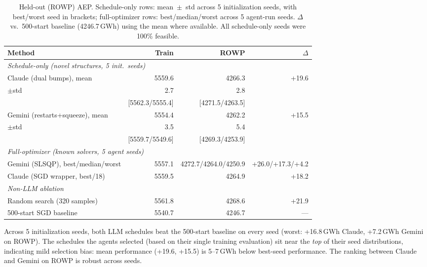 \documentclass{article}
\begin{document}
\begin{table}[t]
\caption{Held-out (ROWP) AEP. Schedule-only rows: mean~$\pm$~std
across 5 initialization seeds, with best/worst seed in brackets;
full-optimizer rows: best/median/worst across 5 agent-run seeds.
$\Delta$ vs.\ 500-start baseline (4246.7\,GWh) using the mean where
available. All schedule-only seeds were 100\% feasible.}
\label{tab:main}
\vskip 0.1in
\begin{center}
\begin{small}
\begin{sc}
\begin{tabular}{lrrr}
\toprule
Method & Train & ROWP & $\Delta$ \\
\midrule
\multicolumn{4}{l}{\emph{Schedule-only (novel structures, 5 init.\ seeds)}} \\
Claude (dual bumps), mean          & 5559.6 & 4266.3 & +19.6 \\
\quad $\pm$std                     & 2.7    & 2.8    &       \\
            & [5562.3/5555.4] & [4271.5/4263.5] & \\
Gemini (restarts+squeeze), mean    & 5554.4 & 4262.2 & +15.5 \\
\quad $\pm$std                     & 3.5    & 5.4    &       \\
            & [5559.7/5549.6] & [4269.3/4253.9] & \\
\midrule
\multicolumn{4}{l}{\emph{Full-optimizer (known solvers, 5 agent seeds)}} \\
Gemini (SLSQP), best/median/worst  & 5557.1 & 4272.7/4264.0/4250.9 & +26.0/+17.3/+4.2 \\
Claude (SGD wrapper, best/18)      & 5559.5 & 4264.9 & +18.2 \\
\midrule
\multicolumn{4}{l}{\emph{Non-LLM ablation}} \\
Random search (320 samples)        & 5561.8 & 4268.6 & +21.9 \\
\midrule
500-start SGD baseline             & 5540.7 & 4246.7 & ---   \\
\bottomrule
\end{tabular}
\end{sc}
\end{small}
\end{center}
\vskip -0.1in
\end{table}

Across 5 initialization seeds, both LLM schedules beat the 500-start
baseline on every seed (worst: +16.8\,GWh Claude, +7.2\,GWh Gemini
on ROWP). The schedules the agents selected (based on their single
training evaluation) sit near the \emph{top} of their seed
distributions, indicating mild selection bias: mean performance
(+19.6, +15.5) is 5--7\,GWh below best-seed performance. The ranking
between Claude and Gemini on ROWP is robust across seeds.
\end{document}
